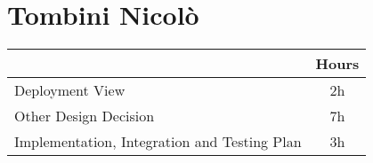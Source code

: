 \section{Tombini Nicolò}
\begin{table}[H]
\centering
\begin{tabular}{|l|c|}
\hline
\rowcolor[HTML]{B8C8D5} 
\multicolumn{1}{|c|}{\cellcolor[HTML]{B8C8D5}\textbf{Topic}} & \textbf{Hours} \\ \hline
Deployment View & 2h \\ \hline
Other Design Decision & 7h \\ \hline
Implementation, Integration and Testing Plan & 3h \\ \hline
\end{tabular}
\end{table}
